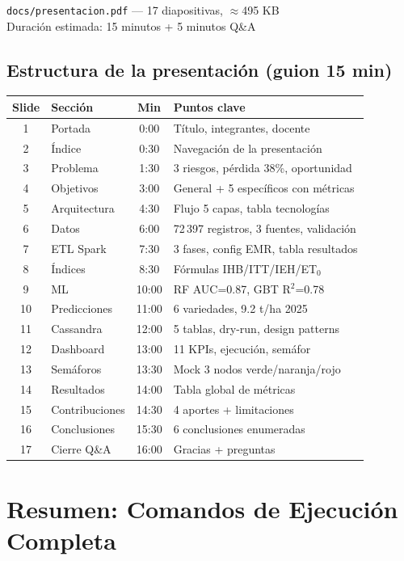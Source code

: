 \documentclass[11pt,a4paper]{article}
\begin{document}
\begin{okbox}[]
\texttt{docs/presentacion.pdf} --- 17 diapositivas, $\approx$495 KB\\
Duraci\'on estimada: 15 minutos + 5 minutos Q\&A
\end{okbox}

\subsection{Estructura de la presentaci\'on (guion 15 min)}

\begin{tabular}{clcp{5.5cm}}
\toprule
Slide & Secci\'on & Min & Puntos clave \\
\midrule
1 & Portada & 0:00 & T\'itulo, integrantes, docente \\
2 & \'Indice & 0:30 & Navegaci\'on de la presentaci\'on \\
3 & Problema & 1:30 & 3 riesgos, p\'erdida 38\%, oportunidad \\
4 & Objetivos & 3:00 & General + 5 espec\'ificos con m\'etricas \\
5 & Arquitectura & 4:30 & Flujo 5 capas, tabla tecnolog\'ias \\
6 & Datos & 6:00 & 72\,397 registros, 3 fuentes, validaci\'on \\
7 & ETL Spark & 7:30 & 3 fases, config EMR, tabla resultados \\
8 & \'Indices & 8:30 & F\'ormulas IHB/ITT/IEH/ET$_0$ \\
9 & ML & 10:00 & RF AUC=0.87, GBT R$^2$=0.78 \\
10 & Predicciones & 11:00 & 6 variedades, 9.2 t/ha 2025 \\
11 & Cassandra & 12:00 & 5 tablas, dry-run, design patterns \\
12 & Dashboard & 13:00 & 11 KPIs, ejecuci\'on, sem\'afor \\
13 & Sem\'aforos & 13:30 & Mock 3 nodos verde/naranja/rojo \\
14 & Resultados & 14:00 & Tabla global de m\'etricas \\
15 & Contribuciones & 14:30 & 4 aportes + limitaciones \\
16 & Conclusiones & 15:30 & 6 conclusiones enumeradas \\
17 & Cierre Q\&A & 16:00 & Gracias + preguntas \\
\bottomrule
\end{tabular}

\section{Resumen: Comandos de Ejecuci\'on Completa}
\end{document}
